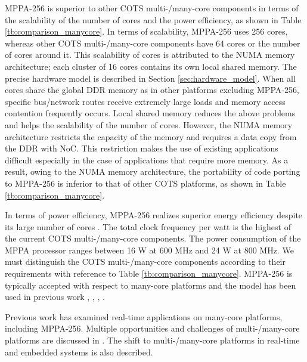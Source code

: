   MPPA-256 is superior to other COTS multi-/many-core components in terms of the scalability of the number of cores and the power efficiency, as shown in Table \ref{tb:comparison_manycore}.
  In terms of scalability, MPPA-256 uses 256 cores, whereas other COTS multi-/many-core components have 64 cores or the number of cores around it.
  This scalability of cores is attributed to the NUMA memory architecture; each cluster of 16 cores contains its own local shared memory.
  The precise hardware model is described in Section \ref{sec:hardware_model}.
  When all cores share the global DDR memory as in other platforms excluding MPPA-256, specific bus/network routes receive extremely large loads and memory access contention frequently occurs.
  Local shared memory reduces the above problems and helps the scalability of the number of cores.
  However, the NUMA memory architecture restricts the capacity of the memory and requires a data copy from the DDR with NoC.
  This restriction makes the use of existing applications difficult especially in the case of applications that require more memory.
  As a result, owing to the NUMA memory architecture, the portability of code porting to MPPA-256 is inferior to that of other COTS platforms, as shown in Table \ref{tb:comparison_manycore}.
  
  In terms of power efficiency, MPPA-256 realizes superior energy efficiency despite its large number of cores \cite{kanter2015kalray}.
  The total clock frequency per watt is the highest of the current COTS multi-/many-core components.
  The power consumption of the MPPA processor ranges between 16 W at 600 MHz and 24 W at 800 MHz.
  We must distinguish the COTS multi-/many-core components according to their requirements with reference to Table \ref{tb:comparison_manycore}.
  MPPA-256 is typically accepted with respect to many-core platforms and the model has been used in previous work \cite{becker2016contention}, \cite{carle2014static}, \cite{perret2016mapping}, \cite{perret2016predictable}.
  
  Previous work has examined real-time applications on many-core platforms, including MPPA-256.
  Multiple opportunities and challenges of multi-/many-core platforms are discussed in \cite{saidi2015shift}.
  The shift to multi-/many-core platforms in real-time and embedded systems is also described. 
  
